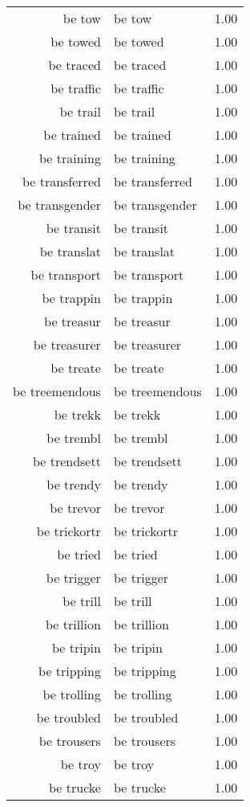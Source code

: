 \begin{table}[ht]
\begin{tabular}{rlr}
  be tow & be tow & 1.00 \\ 
  be towed & be towed & 1.00 \\ 
  be traced & be traced & 1.00 \\ 
  be traffic & be traffic & 1.00 \\ 
  be trail & be trail & 1.00 \\ 
  be trained & be trained & 1.00 \\ 
  be training & be training & 1.00 \\ 
  be transferred & be transferred & 1.00 \\ 
  be transgender & be transgender & 1.00 \\ 
  be transit & be transit & 1.00 \\ 
  be translat & be translat & 1.00 \\ 
  be transport & be transport & 1.00 \\ 
  be trappin & be trappin & 1.00 \\ 
  be treasur & be treasur & 1.00 \\ 
  be treasurer & be treasurer & 1.00 \\ 
  be treate & be treate & 1.00 \\ 
  be treemendous & be treemendous & 1.00 \\ 
  be trekk & be trekk & 1.00 \\ 
  be trembl & be trembl & 1.00 \\ 
  be trendsett & be trendsett & 1.00 \\ 
  be trendy & be trendy & 1.00 \\ 
  be trevor & be trevor & 1.00 \\ 
  be trickortr & be trickortr & 1.00 \\ 
  be tried & be tried & 1.00 \\ 
  be trigger & be trigger & 1.00 \\ 
  be trill & be trill & 1.00 \\ 
  be trillion & be trillion & 1.00 \\ 
  be tripin & be tripin & 1.00 \\ 
  be tripping & be tripping & 1.00 \\ 
  be trolling & be trolling & 1.00 \\ 
  be troubled & be troubled & 1.00 \\ 
  be trousers & be trousers & 1.00 \\ 
  be troy & be troy & 1.00 \\ 
  be trucke & be trucke & 1.00 \\ 

\end{tabular}
\end{table}
